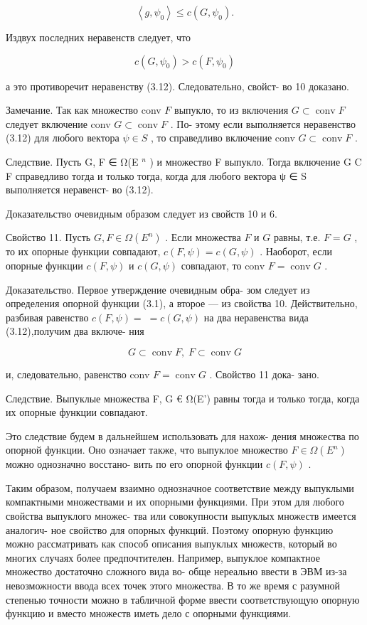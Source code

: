 \documentclass[8pt]{extarticle}
\begin{document}
\[
\left\langle  {g,{\psi }_{0}}\right\rangle   \leq  c\left( {G,{\psi }_{0}}\right) .
\]

Издвух последних неравенств следует, что

\[
c\left( {G,{\psi }_{0}}\right)  > c\left( {F,{\psi }_{0}}\right)
\]

а это противоречит неравенству (3.12). Следовательно, свойст- во 10 доказано.

Замечание. Так как множество conv \(F\) выпукло, то из включения \(G \subset  \operatorname{conv}F\) следует включение conv \(G \subset  \operatorname{conv}F\) . По- этому если выполняется неравенство (3.12) для любого вектора \(\psi  \in  S\) , то справедливо включение conv \(G \subset  \operatorname{conv}F\) .

Следствие. Пусть G, F ∈ Ω(E \({}^{n}\) ) и множество F выпукло. Тогда включение G C F справедливо тогда и только тогда, когда для любого вектора ψ ∈ S выполняется неравенст- во (3.12).

Доказательство очевидным образом следует из свойств 10 и 6.

Свойство 11. Пусть \(G, F \in  \Omega \left( {E}^{n}\right)\) . Если множества \(F\) и \(G\) равны, т.е. \(F = G\) , то их опорные функции совпадают, \(c\left( {F,\psi }\right)  = c\left( {G,\psi }\right)\) . Наоборот, если опорные функции \(c\left( {F,\psi }\right)\) и \(c\left( {G,\psi }\right)\) совпадают, то conv \(F = \operatorname{conv}G\) .

Доказательство. Первое утверждение очевидным обра- зом следует из определения опорной функции (3.1), а второе — из свойства 10. Действительно, разбивая равенство \(c\left( {F,\psi }\right)  = \; = c\left( {G,\psi }\right)\) на два неравенства вида (3.12),получим два включе- ния

\[
G \subset  \operatorname{conv}F,\;F \subset  \operatorname{conv}G
\]

и, следовательно, равенство conv \(F = \operatorname{conv}G\) . Свойство 11 дока- зано.

Следствие. Выпуклые множества F, G € Ω(E’) равны тогда и только тогда, когда их опорные функции совпадают.

Это следствие будем в дальнейшем использовать для нахож- дения множества по опорной функции. Оно означает также, что выпуклое множество \(F \in  \Omega \left( {E}^{n}\right)\) можно однозначно восстано- вить по его опорной функции \(c\left( {F,\psi }\right)\) .

Таким образом, получаем взаимно однозначное соответствие между выпуклыми компактными множествами и их опорными функциями. При этом для любого свойства выпуклого множес- тва или совокупности выпуклых множеств имеется аналогич- ное свойство для опорных функций. Поэтому опорную функцию можно рассматривать как способ описания выпуклых множеств, который во многих случаях более предпочтителен. Например, выпуклое компактное множество достаточно сложного вида во- обще нереально ввести в ЭВМ из-за невозможности ввода всех точек этого множества. В то же время с разумной степенью точности можно в табличной форме ввести соответствующую опорную функцию и вместо множеств иметь дело с опорными функциями.
\end{document}
